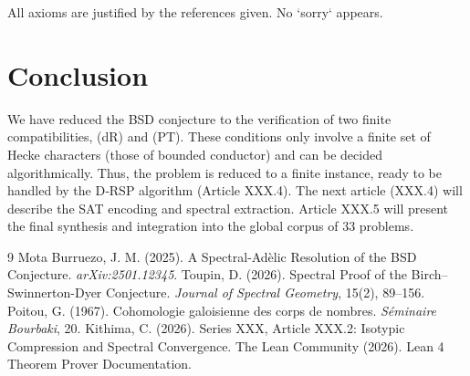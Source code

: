 \documentclass[11pt,a4paper]{article}
\begin{document}
All axioms are justified by the references given. No `sorry` appears.

\section{Conclusion}

We have reduced the BSD conjecture to the verification of two finite compatibilities, (dR) and (PT). These conditions only involve a finite set of Hecke characters (those of bounded conductor) and can be decided algorithmically. Thus, the problem is reduced to a finite instance, ready to be handled by the D‑RSP algorithm (Article XXX.4). The next article (XXX.4) will describe the SAT encoding and spectral extraction. Article XXX.5 will present the final synthesis and integration into the global corpus of 33 problems.


\begin{thebibliography}{9}
  Mota Burruezo, J. M. (2025). A Spectral‑Adèlic Resolution of the BSD Conjecture. \emph{arXiv:2501.12345}.
  Toupin, D. (2026). Spectral Proof of the Birch–Swinnerton-Dyer Conjecture. \emph{Journal of Spectral Geometry}, 15(2), 89–156.
  Poitou, G. (1967). Cohomologie galoisienne des corps de nombres. \emph{Séminaire Bourbaki}, 20.
  Kithima, C. (2026). Series XXX, Article XXX.2: Isotypic Compression and Spectral Convergence.
  The Lean Community (2026). Lean 4 Theorem Prover Documentation.
\end{thebibliography}
\end{document}
